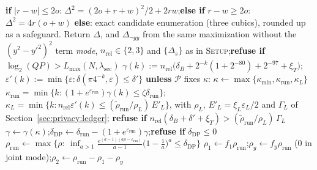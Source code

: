 \begin{algorithm}[p]
\caption{Subroutines}
\label{alg:sub}
\small
\begin{algorithmic}[1]
 
  \State \textbf{if} $|r-w|\le2o$: $\Delta^2=(2o+r+w)^2/2+2rw$;\quad \textbf{else if} $r-w\ge2o$: $\Delta^2=4r(o+w)$
  \State \textbf{else}: exact candidate enumeration (three cubics), rounded up as a safeguard. Return $\Delta$, and $\Delta_{\neg yy}$ from the same maximization without the $(y^2-y'^2)^2$ term
  \State {}
\EndFunction
\Statex
{} 
  \State \textit{mode}, $n_{\mathrm{rel}}\in\{2,3\}$ and $\{\Delta_s\}$ as in \textsc{Setup};\quad \textbf{refuse if} $\log_2(QP)>L_{\max}(N,\lambda_{\mathrm{sec}})$
  \State $\gamma(k):=n_{\mathrm{rel}}\bigl(\delta_B+2^{-k}(1+2^{-80})+2^{-97}+\xi_T\bigr)$;\quad $\varepsilon'(k):=\min\{\varepsilon:\delta(\pi4^{-k},\varepsilon)\le\delta'\}$ 
  \State \textbf{unless} $\mathcal P$ fixes $\kappa$: $\kappa\gets\max\{\kappa_{\min},\kappa_{\mathrm{run}},\kappa_L\}$ 
  \Statex \hspace{\algorithmicindent}$\kappa_{\mathrm{run}}=\min\{k:(1+e^{\varepsilon_{\mathrm{run}}})\gamma(k)\le\zeta\delta_{\mathrm{run}}\}$;\quad $\kappa_L=\min\{k:n_{\mathrm{rel}}\varepsilon'(k)\le(\tilde\rho_{\mathrm{run}}/\rho_L)\,E'_L\}$,
  \Statex \hspace{\algorithmicindent}with $\rho_L$, $E'_L=\xi_L\varepsilon_L/2$ and $\Gamma_L$ of Section~\ref{sec:privacy:ledger}; \textbf{refuse if} $n_{\mathrm{rel}}(\delta_B+\delta'+\xi_T)>(\tilde\rho_{\mathrm{run}}/\rho_L)\,\Gamma_L$
  \State $\gamma\gets\gamma(\kappa)$;\quad $\delta_{\mathrm{DP}}\gets\delta_{\mathrm{run}}-(1+e^{\varepsilon_{\mathrm{run}}})\gamma$;\quad \textbf{refuse if} $\delta_{\mathrm{DP}}\le0$
  \State $\rho_{\mathrm{run}}\gets\max\{\rho:\ \inf_{a>1}\frac{e^{(a-1)(a\rho-\varepsilon_{\mathrm{run}})}}{a-1}\bigl(1-\tfrac1a\bigr)^{a}\le\delta_{\mathrm{DP}}\}$ 
  \State $\rho_1\gets f_1\rho_{\mathrm{run}}$;\quad $\rho_y\gets f_y\rho_{\mathrm{run}}$ (0 in joint mode);\quad $\rho_2\gets\rho_{\mathrm{run}}-\rho_1-\rho_y$

\end{algorithmic}
\end{algorithm}
